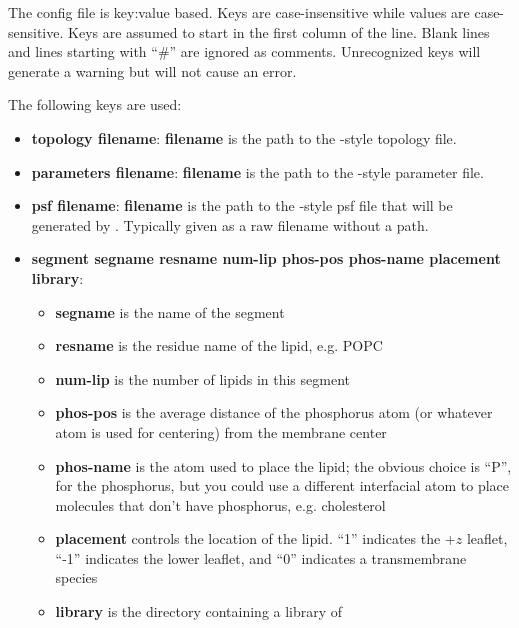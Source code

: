 \documentclass[12pt]{article}
\begin{document}
The config file is key:value based.  Keys are case-insensitive while values
are case-sensitive.  Keys are assumed to start in the first column of the
line.  Blank lines and lines starting with ``\#'' are ignored as comments.
Unrecognized keys will generate a warning but will not cause an error.

The following keys are used:

\begin{itemize}
    \item {\bf topology filename}: {\bf filename} is the path to the
                                    \namd-style topology file.
    \item {\bf parameters filename}: {\bf filename} is the path to the
                                    \namd-style parameter file.
    \item {\bf psf filename}:  {\bf filename} is the path to the \namd-style
                               psf file that will be generated by \omgwtf.
                               Typically given as a raw filename without a
                               path. 
    \item {\bf segment segname resname num-lip phos-pos phos-name placement library}:
          \begin{itemize}
             \item {\bf segname} is the name of the segment
             \item {\bf resname} is the residue name of the lipid, e.g. POPC
             \item {\bf num-lip} is the number of lipids in this segment
             \item {\bf phos-pos} is the average distance of the phosphorus
             atom (or whatever atom is used for centering) from the membrane center
             \item {\bf phos-name} is the atom used to place the lipid; the
                 obvious choice is ``P'', for the phosphorus, but you
                 could use a different interfacial atom to place molecules
                 that don't have phosphorus, e.g. cholesterol
             \item {\bf placement} controls the location of the lipid. ``1''
             indicates the +$z$ leaflet, ``-1'' indicates the lower leaflet,
             and ``0'' indicates a transmembrane species
             \item {\bf library} is the directory containing a library of

\end{itemize}
\end{itemize}
\end{document}
